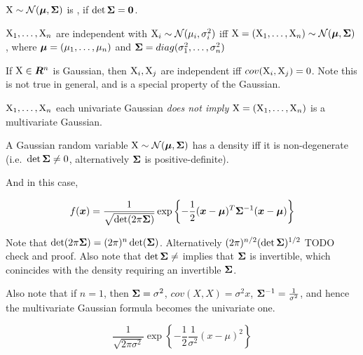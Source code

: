 \begin{defn}
    ${\textnormal{X}} \sim {\mathcal{N}}({\bm{\mu}}, {\bm{\Sigma}})$ is , if $\det {\bm{\Sigma}} = {\bm{0}}$.
\end{defn}

\begin{rem}
    ${\textnormal{X}}_1, \dots, {\textnormal{X}}_n$ are independent with ${\textnormal{X}}_i \sim {\mathcal{N}}(\mu_i, \sigma_i^2)$ iff ${\textnormal{X}} = ({\textnormal{X}}_1, \dots, {\textnormal{X}}_n) \sim {\mathcal{N}}({\bm{\mu}}, {\bm{\Sigma}})$, where ${\bm{\mu}} = (\mu_1, \dots, \mu_n)$ and ${\bm{\Sigma}} = diag(\sigma_1^2, \dots, \sigma_n^2)$
\end{rem}

\begin{thm}
    If ${\textnormal{X}} \in {\bm{R}}^n$ is Gaussian, then ${\textnormal{X}}_i, {\textnormal{X}}_j$ are independent iff $cov({\textnormal{X}}_i, {\textnormal{X}}_j) = 0$. Note this is not true in general, and is a special property of the Gaussian.
\end{thm}

\begin{thm}
    ${\textnormal{X}}_1, \dots, {\textnormal{X}}_n$ each univariate Gaussian \emph{does not imply} ${\textnormal{X}} = ({\textnormal{X}}_1, \dots, {\textnormal{X}}_n)$ is a multivariate Gaussian.
\end{thm}

\begin{thm}
    A Gaussian random variable ${\textnormal{X}} \sim {\mathcal{N}}({\bm{\mu}}, {\bm{\Sigma}})$ has a density iff it is non-degenerate (i.e.\ $\det {\bm{\Sigma}} \neq 0$, alternatively ${\bm{\Sigma}}$ is positive-definite).
    
    And in this case,
    
    \begin{equation}
        f({\bm{x}}) = \frac{1}{\sqrt{\det(2 \pi {\bm{\Sigma}})}} \exp{ \left\{ - \frac{1}{2} ({\bm{x}}- {\bm{\mu}})^T {\bm{\Sigma}}^{-1} ({\bm{x}}- {\bm{\mu}}) \right\} }
    \end{equation}
    
    Note that $\det(2 \pi {\bm{\Sigma}}) = (2\pi)^n \det({\bm{\Sigma}})$. Alternatively $(2 \pi)^{n/2} (\det {\bm{\Sigma}})^{1/2}$ {TODO check and proof}. Also note that $\det {\bm{\Sigma}} \neq$ implies that ${\bm{\Sigma}}$ is invertible, which conincides with the density requiring an invertible ${\bm{\Sigma}}$.
    
    Also note that if $n = 1$, then ${\bm{\Sigma}} = \sigma^2$, $cov(X, X) = \sigma^2 x$, ${\bm{\Sigma}}^{-1} = \frac{1}{\sigma^2}$, and hence the multivariate Gaussian formula becomes the univariate one.
    
    \begin{equation}
        \frac{1}{\sqrt{2 \pi \sigma^2}} \exp{\left\{ - \frac{1}{2} \frac{1}{\sigma^2} (x - \mu)^2\right\}}
    \end{equation}
\end{thm}

